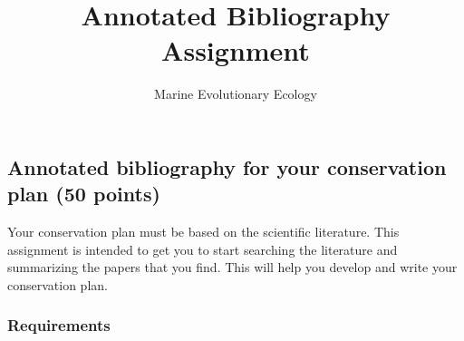 \documentclass[12pt]{article}
\title{Annotated Bibliography Assignment}
\author{Marine Evolutionary Ecology}
\date{}                                           %
\begin{document}
\thispagestyle{plain}


\subsection*{Annotated bibliography for your conservation plan (50 points)}

Your conservation plan must be based on the scientific literature. This assignment is intended to get you to start searching the literature and summarizing the papers that you find. This will help you develop and write your conservation plan. 

\subsubsection*{Requirements}
\end{document}
